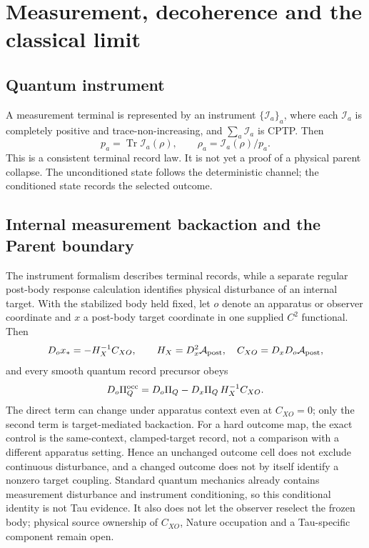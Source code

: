 \documentclass[11pt]{article}
\newcommand{\Tr}{\operatorname{Tr}}
\begin{document}
\section{Measurement, decoherence and the classical limit}

\subsection{Quantum instrument}
A measurement terminal is represented by an instrument
$\{\mathcal I_a\}_a$, where each $\mathcal I_a$ is completely positive and
trace-non-increasing, and $\sum_a\mathcal I_a$ is CPTP.  Then
\begin{equation}
 p_a=\Tr\mathcal I_a(\rho),\qquad
 \rho_a=\mathcal I_a(\rho)/p_a.
\end{equation}
This is a consistent terminal record law.  It is not yet a proof of a physical
parent collapse.  The unconditioned state follows the deterministic channel;
the conditioned state records the selected outcome.

\subsection{Internal measurement backaction and the Parent boundary}

The instrument formalism describes terminal records, while a separate regular
post-body response calculation identifies physical disturbance of an internal
target.  With the stabilized body held fixed, let $o$ denote an apparatus or
observer coordinate and $x$ a post-body target coordinate in one supplied
$C^2$ functional.  Then
\begin{equation}
 D_o x_*=-H_X^{-1}C_{XO},\qquad
 H_X=D_x^2\mathcal A_{\rm post},\quad
 C_{XO}=D_xD_o\mathcal A_{\rm post},
 \label{eq:papervi-generalized-backaction}
\end{equation}
and every smooth quantum record precursor obeys
\begin{equation}
 D_o\Pi_Q^{\rm occ}
 =D_o\Pi_Q-D_x\Pi_Q\,H_X^{-1}C_{XO}.
 \label{eq:papervi-quantum-backaction-split}
\end{equation}
The direct term can change under apparatus context even at $C_{XO}=0$; only
the second term is target-mediated backaction.  For a hard outcome map, the
exact control is the same-context, clamped-target record, not a comparison
with a different apparatus setting.  Hence an unchanged outcome cell does not
exclude continuous disturbance, and a changed outcome does not by itself
identify a nonzero target coupling.  Standard quantum mechanics already
contains measurement disturbance and instrument conditioning, so this
conditional identity is not Tau evidence.  It also does not let the observer
reselect the frozen body; physical source ownership of $C_{XO}$, Nature
occupation and a Tau-specific component remain open.
\end{document}
